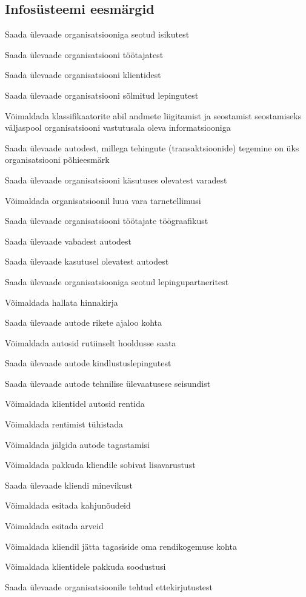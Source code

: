 \subsection{Infosüsteemi eesmärgid}
\begin{myitemize}
	\item Saada ülevaade organisatsiooniga seotud isikutest
	\item Saada ülevaade organisatsiooni töötajatest
	\item Saada ülevaade organisatsiooni klientidest
	\item Saada ülevaade organisatsiooni sõlmitud lepingutest
	\item Võimaldada klassifikaatorite abil andmete liigitamist ja seostamist seostamiseks väljaspool organisatsiooni vastutusala oleva informatsiooniga
	\item Saada ülevaade autodest, millega tehingute (transaktsioonide) tegemine on üks organisatsiooni põhieesmärk
	\item Saada ülevaade organisatsiooni käsutuses olevatest varadest
	\item Võimaldada organisatsioonil luua vara tarnetellimusi
	\item Saada ülevaade organisatsiooni töötajate töögraafikust
	\item Saada ülevaade vabadest autodest
	\item Saada ülevaade kasutusel olevatest autodest
	\item Saada ülevaade organisatsiooniga seotud lepingupartneritest
	\item Võimaldada hallata hinnakirja
	\item Saada ülevaade autode rikete ajaloo kohta
	\item Võimaldada autosid rutiinselt hooldusse saata
	\item Saada ülevaade autode kindlustuslepingutest
	\item Saada ülevaade autode tehnilise ülevaatusese seisundist
	\item Võimaldada klientidel autosid rentida
	\item Võimaldada rentimist tühistada
	\item Võimaldada jälgida autode tagastamisi
	\item Võimaldada pakkuda kliendile sobivat lisavarustust
	\item Saada ülevaade kliendi minevikust
	\item Võimaldada esitada kahjunõudeid
	\item Võimaldada esitada arveid
	\item Võimaldada kliendil jätta tagasiside oma rendikogemuse kohta
	\item Võimaldada klientidele pakkuda soodustusi
	\item Saada ülevaade organisatsioonile tehtud ettekirjutustest
\end{myitemize}

